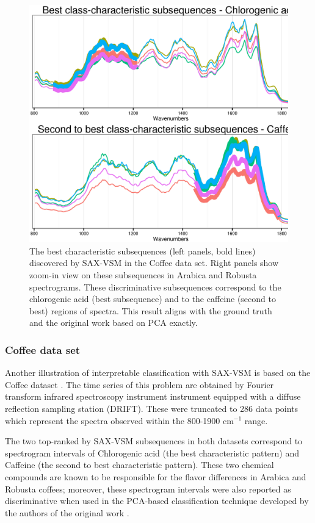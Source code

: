 \begin{figure}[!h!t]
   \centering
   \includegraphics[width=120mm]{figures/coffee_patterns.ps}
   \caption{
   The best characteristic subsequences (left panels, bold lines) discovered by SAX-VSM in
   the {Coffee data set}. Right panels show zoom-in view on these subsequences in Arabica
   and Robusta spectrograms.
   These discriminative subsequences correspond to the chlorogenic acid (best subsequence) 
   and to the caffeine (second to best) regions of spectra. This result aligns with
   the ground truth and the original work based on PCA \cite{citeulike:12550833} exactly.  }
   \label{fig:coffee}
\end{figure}

\subsubsection{Coffee data set}
Another illustration of interpretable classification with SAX-VSM is based on the Coffee dataset \cite{citeulike:12550833}.
The time series of this problem are obtained by Fourier transform infrared spectroscopy instrument instrument equipped 
with a diffuse reflection sampling station (DRIFT). These were truncated to 286 data points which represent the spectra 
observed within the 800-1900 cm$^{-1}$ range. 

The two top-ranked by SAX-VSM subsequences in both datasets correspond to spectrogram intervals of 
Chlorogenic acid (the best characteristic pattern) and Caffeine (the second to best characteristic pattern).
These two chemical compounds are known to be responsible for the flavor differences in Arabica and Robusta coffees; 
moreover, these spectrogram intervals were also reported as discriminative when used in the PCA-based classification 
technique developed by the authors of the original work \cite{citeulike:12550833}.

